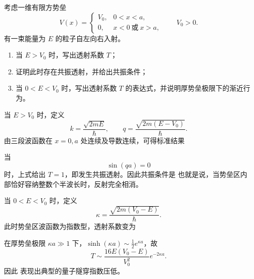 \begin{question}
考虑一维有限方势垒
\[
V(x)=
\begin{cases}
V_0,& 0<x<a,\\
0,& x<0\ \text{或}\ x>a,
\end{cases}
\qquad V_0>0.
\]
有一束能量为 $E$ 的粒子自左向右入射。

\begin{enumerate}[label=(\arabic*),leftmargin=2.5em]
  \item 当 $E>V_0$ 时，写出透射系数 $T$；
  \item 证明此时存在共振透射，并给出共振条件；
  \item 当 $0<E<V_0$ 时，写出透射系数 $T$ 的表达式，并说明厚势垒极限下的渐近行为。
\end{enumerate}

\begin{solution}
当 $E>V_0$ 时，定义
\[
k=\frac{\sqrt{2mE}}{\hbar},
\qquad
q=\frac{\sqrt{2m(E-V_0)}}{\hbar}.
\]
由三段波函数在 $x=0,a$ 处连续及导数连续，可得标准结果

当
\[
\sin(qa)=0
\]
时，上式给出 $T=1$，即发生共振透射。因此共振条件是
也就是说，当势垒区内部恰好容纳整数个半波长时，反射完全相消。

当 $0<E<V_0$ 时，定义
\[
\kappa=\frac{\sqrt{2m(V_0-E)}}{\hbar}.
\]
此时势垒区波函数为指数型，透射系数变为

在厚势垒极限 $\kappa a\gg 1$ 下，$\sinh(\kappa a)\sim \tfrac12 e^{\kappa a}$，故
\[
T\sim \frac{16E(V_0-E)}{V_0^2}e^{-2\kappa a}.
\]
因此
表现出典型的量子隧穿指数压低。
\end{solution}
\end{question}

